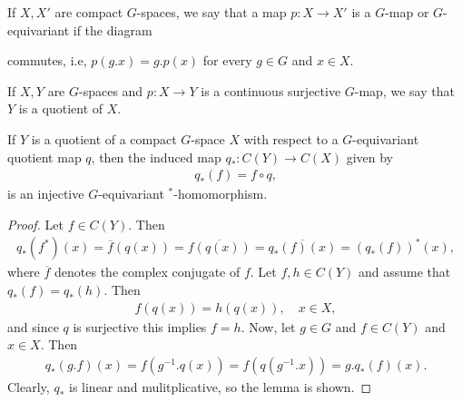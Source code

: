 \begin{definition}
If $X,X'$ are compact $G$-spaces, we say that a map $p \colon X \to X'$ is a $G$-map or $G$-equivariant if the diagram
\begin{center}
\end{center} 
commutes, i.e, $p(g.x)=g.p(x)$ for every $g \in G$ and $x \in X$.
\end{definition}

\begin{definition}
If $X, Y$ are $G$-spaces and $p \colon X \to Y$ is a continuous surjective $G$-map, we say that $Y$ is a quotient of $X$.
\end{definition}

\begin{lemma}
If $Y$ is a quotient of a compact $G$-space $X$ with respect to a $G$-equivariant quotient map $q$, then the induced map $q_* \colon C(Y) \to C(X)$ given by
\begin{align*}
q_*(f)=f \circ q,
\end{align*}
is an injective $G$-equivariant $^*$-homomorphism.
\begin{proof}
Let $f \in C(Y)$. Then
\begin{align*}
q_*(f^*)(x)=\overline{f}(q(x))=\overline{f(q(x))}=\overline{q_*(f)(x)}=(q_*(f))^*(x),
\end{align*}
where $\overline{f}$ denotes the complex conjugate of $f$. Let $f,h \in C(Y)$ and assume that $q_*(f)=q_*(h)$. Then
\begin{align*}
f(q(x))=h(q(x)), \quad x \in X,
\end{align*}
and since $q$ is surjective this implies $f=h$. Now, let $g \in G$ and $f \in C(Y)$ and $x \in X$. Then
\begin{align*}
q_*(g.f)(x)=f(g^{-1}.q(x))=f(q(g^{-1}.x))=g.q_*(f)(x).
\end{align*} 
Clearly, $q_*$ is linear and mulitplicative, so the lemma is shown.
\end{proof}
\end{lemma}

